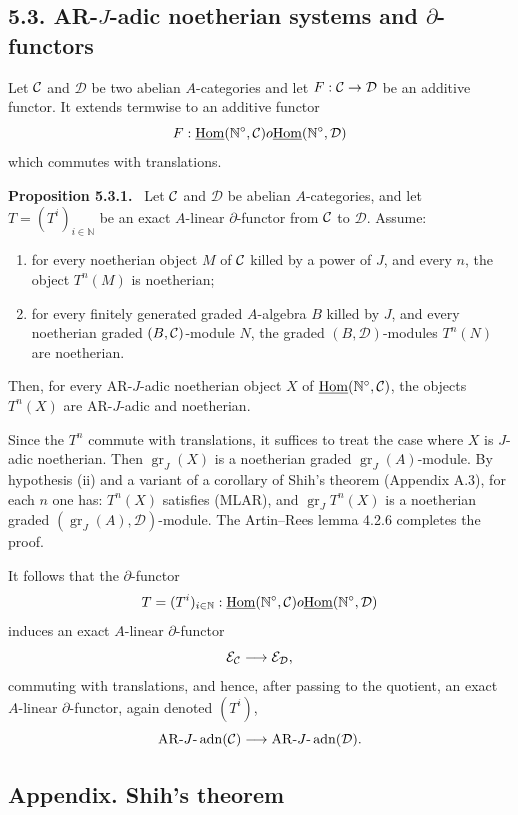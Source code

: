\documentclass[11pt]{article}
\theoremstyle{plain}
\theoremstyle{definition}
\theoremstyle{remark}
\newenvironment{statement}[1]{\par\medskip\noindent\textbf{#1.}\ }{\par\medskip}
\newcommand{\bN}{\mathbb N}
\newcommand{\cD}{\mathcal D}\newcommand{\cE}{\mathcal E}\newcommand{\cF}{\mathcal F}
\DeclareMathOperator{\Hom}{Hom}
\DeclareMathOperator{\gr}{gr}
\newcommand{\AR}{\mathrm{AR}}
\providecommand{\adn}{\operatorname{adn}}
\begin{document}
\subsection*{5.3. AR-$J$-adic noetherian systems and $\partial$-functors}

Let $\mathcal C$ and $\cD$ be two abelian $A$-categories and let
$F:\cC\to\cD$ be an additive functor. It extends termwise to an additive functor
\[
       F:\underline{\Hom}(\bN^\circ,\cC)	o
       \underline{\Hom}(\bN^\circ,\cD)
\]
which commutes with translations.

\begin{statement}{Proposition 5.3.1}
Let $\mathcal C$ and $\cD$ be abelian $A$-categories, and let
$T=(T^i)_{i\in\bN}$ be an exact $A$-linear $\partial$-functor from $\mathcal C$ to $\cD$.
Assume:
\begin{enumerate}[label=(\roman*)]
\item for every noetherian object $M$ of $\mathcal C$ killed by a power of $J$, and every
$n$, the object $T^n(M)$ is noetherian;
\item for every finitely generated graded $A$-algebra $B$ killed by $J$, and every
noetherian graded $(B,\mathcal C)$-module $N$, the graded $(B,\cD)$-modules $T^n(N)$ are
noetherian.
\end{enumerate}
Then, for every AR-$J$-adic noetherian object $X$ of
$\underline{\Hom}(\bN^\circ,\cC)$, the objects $T^n(X)$ are AR-$J$-adic and
noetherian.
\end{statement}

Since the $T^n$ commute with translations, it suffices to treat the case where $X$
is $J$-adic noetherian. Then $\gr_J(X)$ is a noetherian graded
$\gr_J(A)$-module. By hypothesis (ii) and a variant of a corollary of Shih's theorem
(Appendix A.3), for each $n$ one has: $T^n(X)$ satisfies (MLAR), and
$\gr_J T^n(X)$ is a noetherian graded $(\gr_J(A),\cD)$-module. The Artin--Rees
lemma 4.2.6 completes the proof.

It follows that the $\partial$-functor
\[
        T=(T^i)_{i\in\bN}:
        \underline{\Hom}(\bN^\circ,\cC)	o
        \underline{\Hom}(\bN^\circ,\cD)
\]
induces an exact $A$-linear $\partial$-functor
\[
        \cE_\cC\longrightarrow\cE_\cD,
\]
commuting with translations, and hence, after passing to the quotient, an exact
$A$-linear $\partial$-functor, again denoted $(T^i)$,
\[
        \AR\text{-}J\text{-}\adn(\cC)\longrightarrow
        \AR\text{-}J\text{-}\adn(\cD).
\]

\subsection*{Appendix. Shih's theorem}
\end{document}
